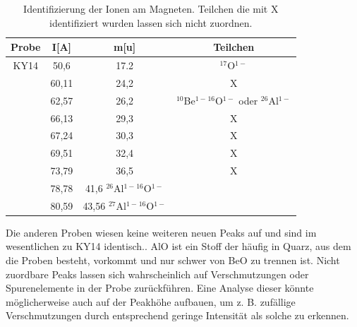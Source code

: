 \begin{table}[h]
\centering
\caption{Identifizierung der Ionen am Magneten. Teilchen die mit X identifiziert wurden lassen sich nicht zuordnen.}
\begin{tabular}{|c| c |c|c|}
\hline
Probe & I[A] & m[u] & Teilchen \\
\hline
KY14    & 50,6    & 17.2 & $^{17}$O$^{1-}$ \\
 	& 60,11 & 24,2 & X\\
	& 62,57 & 26,2 & $^{10}$Be$^{1-}$$^{16}$O$^{1-}$ oder  $^{26}$Al$^{1-}$ \\
	& 66,13 & 29,3 & X\\
	& 67,24 & 30,3 & X\\
	& 69,51 & 32,4 & X\\
	& 73,79 & 36,5 & X\\
	& 78,78 & 41,6 $^{26}$Al$^{1-}$$^{16}$O$^{1-}$\\
	& 80,59 &43,56 $^{27}$Al$^{1-}$$^{16}$O$^{1-}$\\
\end{tabular}
\label{KY}
\end{table}
Die anderen Proben wiesen keine weiteren neuen Peaks auf und sind im wesentlichen zu KY14 identisch..
AlO ist ein Stoff der häufig in Quarz, aus dem die Proben besteht, vorkommt und nur schwer von BeO zu trennen ist.
Nicht zuordbare Peaks lassen sich wahrscheinlich auf Verschmutzungen oder Spurenelemente in der Probe zurückführen.
Eine Analyse dieser könnte möglicherweise auch auf der Peakhöhe aufbauen, um z. B. zufällige Verschmutzungen durch entsprechend geringe Intensität als solche zu erkennen.

